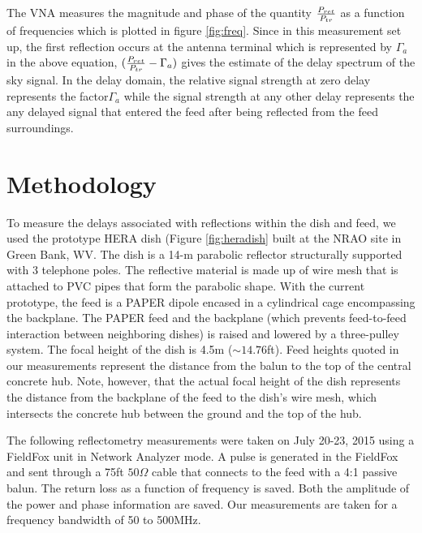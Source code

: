 \documentclass[12pt,preprint]{aastex}
\begin{document}
 
The VNA measures the magnitude and phase of the quantity ${P_{ret}\over P_{tr}}$ as a function of frequencies which is plotted in figure \ref{fig:freq}. Since in this measurement set up, the first reflection occurs at the antenna terminal which is represented by $\Gamma_{a}$ in the above equation, $({P_{ret} \over P_{tr} }  - \Gamma_{a}) $ gives the estimate of the delay spectrum of the sky signal. In the delay domain, the relative signal strength at zero delay represents the factor$\Gamma_{a}$ while the signal strength at any other delay represents the any delayed signal that entered the feed after being reflected from the feed surroundings. 
 








\section{Methodology}

To measure the delays associated with reflections within the dish and feed, we
used the prototype HERA dish (Figure \ref{fig:heradish} built at the NRAO site in
Green Bank, WV. The dish is a 14-m parabolic reflector structurally supported
with 3 telephone poles. The reflective material is made up of wire mesh that
is attached to PVC pipes that form the parabolic shape. With the current
prototype, the feed is a PAPER dipole encased in a cylindrical cage encompassing
the backplane. The PAPER feed and the backplane (which prevents feed-to-feed
interaction between neighboring dishes) is raised and lowered by a three-pulley
system. The focal height of the dish is 4.5m ($\sim{14.76}$ft). Feed heights quoted in our measurements represent the distance from the balun to the top of the central concrete hub. Note, however, that the actual focal height of the dish represents the distance from the backplane of the feed to the dish's wire mesh, which intersects the concrete hub between the ground and the top of the hub. 

The following reflectometry measurements were taken on July 20-23, 2015 using a
FieldFox unit in Network Analyzer mode. A pulse is generated in the FieldFox
and sent through a 75ft $50\Omega$ cable that connects to the feed with a 4:1
passive balun. The return loss as a function of frequency is saved. Both
the amplitude of the power and phase information are saved. Our
measurements are taken for a frequency bandwidth of 50 to 500MHz. 
\end{document}
